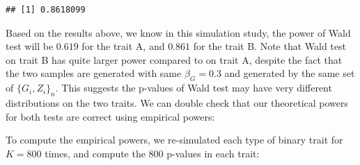 \documentclass[
]{article}
\newenvironment{Shaded}{\begin{snugshade}}{\end{snugshade}}
\newcommand{\AttributeTok}[1]{\textcolor[rgb]{0.77,0.63,0.00}{#1}}
\newcommand{\ControlFlowTok}[1]{\textcolor[rgb]{0.13,0.29,0.53}{\textbf{#1}}}
\newcommand{\DecValTok}[1]{\textcolor[rgb]{0.00,0.00,0.81}{#1}}
\newcommand{\DocumentationTok}[1]{\textcolor[rgb]{0.56,0.35,0.01}{\textbf{\textit{#1}}}}
\newcommand{\FloatTok}[1]{\textcolor[rgb]{0.00,0.00,0.81}{#1}}
\newcommand{\FunctionTok}[1]{\textcolor[rgb]{0.00,0.00,0.00}{#1}}
\newcommand{\NormalTok}[1]{#1}
\newcommand{\OtherTok}[1]{\textcolor[rgb]{0.56,0.35,0.01}{#1}}
\newcommand{\SpecialCharTok}[1]{\textcolor[rgb]{0.00,0.00,0.00}{#1}}
\newcommand{\StringTok}[1]{\textcolor[rgb]{0.31,0.60,0.02}{#1}}
\begin{document}
\begin{verbatim}
## [1] 0.8618099
\end{verbatim}

Based on the results above, we know in this simulation study, the power
of Wald test will be \(0.619\) for the trait A, and \(0.861\) for the
trait B. Note that Wald test on trait B has quite larger power compared
to on trait A, despite the fact that the two samples are generated with
same \(\beta_G = 0.3\) and generated by the same set of
\(\{G_i,Z_i\}_n\). This suggests the p-values of Wald test may have very
different distributions on the two traits. We can double check that our
theoretical powers for both tests are correct using empirical powers:

To compute the empirical powers, we re-simulated each type of binary
trait for \(K = 800\) times, and compute the \(800\) p-values in each
trait:

\begin{Shaded}
\end{Shaded}
\end{document}
